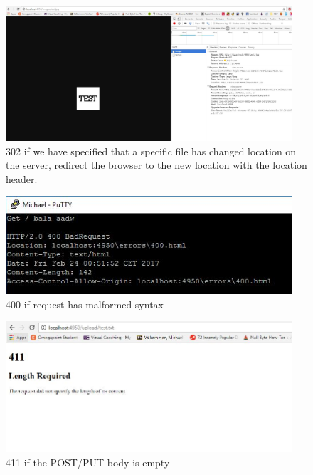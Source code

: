 \documentclass[a4paper,12pt]{article}
\numberwithin{figure}{section}
\begin{document}
\begin{figure}[h!]
	\centering
	\label{302}
	\includegraphics[width=0.95\textwidth,keepaspectratio]{img/302.jpg} 
	\caption{302 if we have specified that a specific file has changed location on the server, redirect the browser to the new location with the location header.}
\end{figure}

\begin{figure}[h!]
	\centering
	\label{400}
	\includegraphics[width=0.95\textwidth,keepaspectratio]{img/400.jpg} 
	\caption{400 if request has malformed syntax}
\end{figure}

\begin{figure}[h!]
	\centering
	\label{411}
	\includegraphics[width=0.95\textwidth,keepaspectratio]{img/411.jpg} 
	\caption{411 if the POST/PUT body is empty}
\end{figure}
\end{document}
